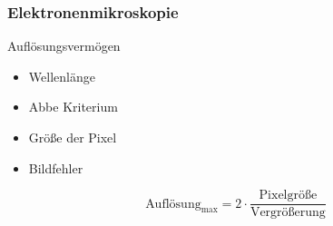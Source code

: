 \begin{frame}
	\frametitle{Elektronenmikroskopie}
	\begin{block}{Auflösungsvermögen}
		\begin{itemize}
			\item Wellenlänge
			\item Abbe Kriterium
			\item Größe der Pixel
			\item Bildfehler
		\end{itemize}
	\end{block}
	\begin{equation*}
		\text{Auflösung}_{\text{max}} = 2 \cdot \frac{\text{Pixelgröße}}{\text{Vergrößerung}}
	\end{equation*}
\end{frame}